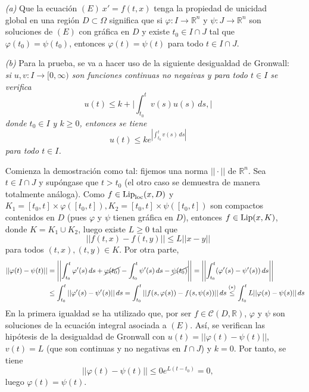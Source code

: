 \documentclass[11pt]{report}
\newcommand{\R}{\mathbb R}
\begin{document}
\begin{itemize}
    \item[\textit{(a)}] Que la ecuación $(E) \ x'=f(t,x)$ tenga la propiedad de unicidad global en una región $D \subset \Omega$ significa que si $\varphi \colon I \to \R^n$ y $\psi \colon J \to \R^n$ son soluciones de $(E)$ con gráfica en $D$ y existe $t_0 \in I \cap J$ tal que $\varphi(t_0)=\psi(t_0)$, entonces $\varphi(t)=\psi(t)$ para todo $t \in I \cap J$.
    \item[\textit{(b)}] Para la prueba, se va a hacer uso de la siguiente desigualdad de Gronwall: \textit{si $u,v \colon I \to [0,\infty)$ son funciones continuas no negaivas y para todo $t \in I$ se verifica}
    \[u(t) \leq k +\Biggl|\int_{t_0}^t v(s)u(s) \, ds, \Biggr|\]
    \textit{donde $t_0 \in I$ y $k \geq 0$, entonces se tiene}
    \[u(t) \leq ke^{|\int_{t_0}^t v(s) \, ds|}\]
    \textit{para todo $t \in I$.} 

    \vspace{2mm}
    
    Comienza la demostración como tal: fijemos una norma $||\cdot ||$ de $\R^n$. Sea $t \in I\cap J$ y supóngase que $t> t_0$ (el otro caso se demuestra de manera totalmente análoga). Como $f\in \textup{Lip}_{\textup{loc}}(x,D)$ y $K_1=[t_0,t] \times \varphi([t_0,t]), K_2=[t_0,t] \times \psi([t_0,t])$ son compactos contenidos en $D$ (pues $\varphi$ y $\psi$ tienen gráfica en $D$), entonces $f \in \textup{Lip}(x,K)$, donde 
$K=K_1 \cup K_2$, luego existe $L \geq 0$ tal que
    \[||f(t,x)-f(t,y)|| \leq L||x-y|| \tag{$\ast$}\]
    para todos $(t,x),(t,y) \in K$. Por otra parte,
    \[
    \begin{aligned}[t]
        ||\varphi(t)-\psi(t)|| &= \Biggl|\Biggl|\int_{t_0}^t \varphi'(s) \, ds +\cancel{\varphi(t_0)}-\int_{t_0}^t \psi'(s)\, ds - \cancel{\psi(t_0)}\Biggr|\Biggr| = \Biggl|\Biggl|\int_{t_0}^t (\varphi'(s)-\psi'(s)) \, ds\Biggr|\Biggr| \\
        &\leq \int_{t_0}^t ||\varphi'(s)-\psi'(s)|| \, ds = \int_{t_0}^t ||f(s,\varphi(s))-f(s,\psi(s))|| \, ds \overset{(\ast)}{\leq} \int_{t_0}^t L||\varphi(s)-\psi(s)|| \, ds
    \end{aligned}
    \]
    En la primera igualdad se ha utilizado que, por ser $f \in \mathcal{C}(D,\R)$, $\varphi$ y $\psi$ son soluciones de la ecuación integral asociada a $(E)$. Así, se verifican las hipótesis de la desigualdad de Gronwall con $u(t)=||\varphi(t)-\psi(t)||$, $v(t)=L$ (que son continuas y no negativas en $I \cap J$) y $k=0$. Por tanto, se tiene
    \[||\varphi(t)-\psi(t)|| \leq 0 e^{L(t-t_0)}=0,\]
    luego $\varphi(t)=\psi(t)$.
\end{itemize}
\end{document}
